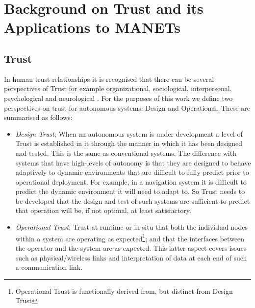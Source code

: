 

\chapter{Background on Trust and its Applications to MANETs} %
\label{Chapter\thechapter}

\section{Trust}

In human trust relationships it is recognised that there can be several perspectives of Trust for example organizational, sociological, interpersonal, psychological and neurological \cite{Lee2004}.
For the purposes of this work we define two perspectives on trust for autonomous systems: Design and Operational. These are summarised as follows:

\begin{itemize}
  \item \emph{Design Trust}; When an autonomous system is under development a level of Trust is established in it through the manner in which it has been designed and tested.
    This is the same as conventional systems.
    The difference with systems that have high-levels of autonomy is that they are designed to behave adaptively to dynamic environments that are difficult to fully predict prior to operational deployment.
    For example, in a navigation system it is difficult to predict the dynamic environment it will need to adapt to.
    So Trust needs to be developed that the design and test of such systems are sufficient to predict that operation will be, if not optimal, at least satisfactory.

  \item \emph{Operational Trust}; Trust at runtime or in-situ that both the individual nodes within a system are operating as expected\footnote{Operational Trust is functionally derived from, but distinct from Design Trust}; and that the interfaces between the operator and the system are as expected.
    This latter aspect covers issues such as physical/wireless links and interpretation of data at each end of such a communication link.
\end{itemize}

